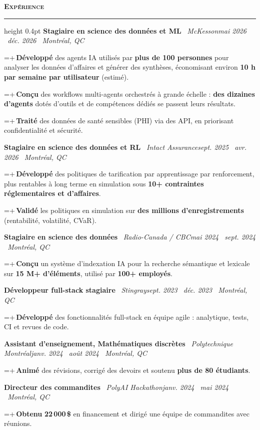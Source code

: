 \documentclass[letterpaper,11pt]{article}
\newcommand{\sep}{\textbar\ }
\newlength{\cvindent}\setlength{\cvindent}{7pt}
\newcommand{\cvsection}[1]{\vspace{9pt}\noindent\textbf{\textsc{#1}}\par\nointerlineskip\vspace{3pt}\hrule height 0.4pt\vspace{7pt}}
\newcommand{\cvrow}[2]{\noindent\hspace{\cvindent}#1\hfill #2\par}
\newlength{\cvbw}
\newcommand{\cvb}[1]{{\fontsize{9.5}{11.4}\selectfont\settowidth{\cvbw}{\textbullet\,}\hangindent=\dimexpr2\cvindent+\cvbw\relax\hangafter=1\noindent\hspace{2\cvindent}\textbullet\,#1\par}}
\newcommand{\cvgap}{\vspace{4pt}}
\begin{document}
\cvsection{Expérience}
\cvrow{\textbf{Stagiaire en science des données et ML} \sep \textit{McKesson}}{\textit{mai 2026 \textendash\ déc. 2026 \sep Montréal, QC}}
\cvb{\textbf{Développé} des agents IA utilisés par \textbf{plus de 100 personnes} pour analyser les données d'affaires et générer des synthèses, économisant environ \textbf{10 h par semaine par utilisateur} (estimé).}
\cvb{\textbf{Conçu} des workflows multi-agents orchestrés à grande échelle : \textbf{des dizaines d'agents} dotés d'outils et de compétences dédiés se passent leurs résultats.}
\cvb{\textbf{Traité} des données de santé sensibles (PHI) via des API, en priorisant confidentialité et sécurité.}
\cvgap
\cvrow{\textbf{Stagiaire en science des données et RL} \sep \textit{Intact Assurance}}{\textit{sept. 2025 \textendash\ avr. 2026 \sep Montréal, QC}}
\cvb{\textbf{Développé} des politiques de tarification par apprentissage par renforcement, plus rentables à long terme en simulation sous \textbf{10+ contraintes réglementaires et d'affaires}.}
\cvb{\textbf{Validé} les politiques en simulation sur \textbf{des millions d'enregistrements} (rentabilité, volatilité, CVaR).}
\cvgap
\cvrow{\textbf{Stagiaire en science des données} \sep \textit{Radio-Canada / CBC}}{\textit{mai 2024 \textendash\ sept. 2024 \sep Montréal, QC}}
\cvb{\textbf{Conçu} un système d'indexation IA pour la recherche sémantique et lexicale sur \textbf{15 M+ d'éléments}, utilisé par \textbf{100+ employés}.}
\cvgap
\cvrow{\textbf{Développeur full-stack stagiaire} \sep \textit{Stingray}}{\textit{sept. 2023 \textendash\ déc. 2023 \sep Montréal, QC}}
\cvb{\textbf{Développé} des fonctionnalités full-stack en équipe agile : analytique, tests, CI et revues de code.}
\cvgap
\cvrow{\textbf{Assistant d'enseignement, Mathématiques discrètes} \sep \textit{Polytechnique Montréal}}{\textit{janv. 2024 \textendash\ août 2024 \sep Montréal, QC}}
\cvb{\textbf{Animé} des révisions, corrigé des devoirs et soutenu \textbf{plus de 80 étudiants}.}
\cvgap
\cvrow{\textbf{Directeur des commandites} \sep \textit{PolyAI Hackathon}}{\textit{janv. 2024 \textendash\ mai 2024 \sep Montréal, QC}}
\cvb{\textbf{Obtenu} \textbf{22\,000\,\$} en financement et dirigé une équipe de commandites avec réunions.}
\cvgap
\end{document}
